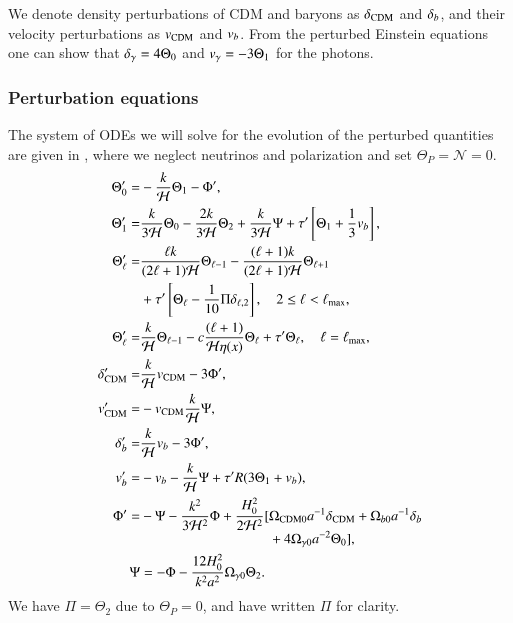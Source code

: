 We denote density perturbations of CDM and baryons as $\delta_\mathrm{CDM}$ and $\delta_b$, and their velocity perturbations as $v_\mathrm{CDM}$ and $v_b$. From the perturbed Einstein equations one can show that $\delta_\gamma=4\Theta_0$ and $v_\gamma=-3\Theta_1$ for the photons. 

\subsubsection{Perturbation equations}
The system of ODEs we will solve for the evolution of the perturbed quantities are given in \cite[Eq. (22)]{callin}, where we neglect neutrinos and polarization and set $\Theta_P=\mathcal{N}=0$.   
\begin{subequations} \label{eq:M3:theory:perturbation_ODEs}
    \begin{align}
        \Theta_0' =& - \frac{k}{\mathcal{H}}\Theta_1 - \Phi', \label{eq:M3:theory:perturbation_ODEs_Theta0}\\
        \Theta_1' =& \frac{k}{3\mathcal{H}}\Theta_0 - \frac{2k}{3\mathcal{H}}\Theta_2 + \frac{k}{3\mathcal{H}}\Psi + \tau' \left[ \Theta_1 + \frac{1}{3}v_b \right], \label{eq:M3:theory:perturbation_ODEs_Theta1} \\ 
        \Theta_\ell' =& \frac{\ell k}{(2\ell+1)\mathcal{H}}\Theta_{\ell-1} - \frac{(\ell+1)k}{(2\ell+1)\mathcal{H}}\Theta_{\ell+1} \nonumber \\
        & + \tau'\left[ \Theta_\ell - \frac{1}{10}\Pi \delta_{\ell,2} \right],\quad 2\leq\ell<\ell_\mathrm{max}, \label{eq:M3:theory:perturbation_ODEs_Theta_ell} \\
        \Theta_\ell' =& \frac{k}{\mathcal{H}}\Theta_{\ell-1} - c \frac{(\ell+1)}{\mathcal{H}\eta(x)}\Theta_{\ell} + \tau' \Theta_\ell,\quad \ell=\ell_\mathrm{max}, \label{eq:M3:theory:perturbation_ODEs_Theta_ell_max} \\
        \delta_\mathrm{CDM}' =& \frac{k}{\mathcal{H}} v_\mathrm{CDM} - 3\Phi', \label{eq:M3:theory:perturbation_ODEs_delta_cdm} \\
        v_\mathrm{CDM}' =& - v_\mathrm{CDM} \frac{k}{\mathcal{H}} \Psi, \label{eq:M3:theory:perturbation_ODEs_v_cdm} \\
        \delta_b' =& \frac{k}{\mathcal{H}} v_b - 3\Phi', \label{eq:M3:theory:perturbation_ODEs_delta_b} \\
        v_b' =& -v_b - \frac{k}{\mathcal{H}} \Psi + \tau' R(3\Theta_1 + v_b), \label{eq:M3:theory:perturbation_ODEs_v_b} \\
        \Phi' =& -\Psi - \frac{k^2}{3\mathcal{H}^2}\Phi + \frac{H_0^2}{2\mathcal{H}^2} \begin{aligned}[t]
            [&\Omega_\mathrm{CDM0} a^{-1}\delta_\mathrm{CDM} + \Omega_{b0} a^{-1} \delta_b \\
            &+4\Omega_{\gamma 0} a^{-2} \Theta_0], 
            \end{aligned} \label{eq:M3:theory:perturbation_ODEs_Phi} \\
        \Psi &= -\Phi - \frac{12H_0^2}{k^2 a^2} \Omega_{\gamma 0} \Theta_2. \label{eq:M3:theory:perturbation_ODEs_Psi}
    \end{align}
\end{subequations}
We have $\Pi=\Theta_2$ due to $\Theta_P=0$, and have written $\Pi$ for clarity. 

